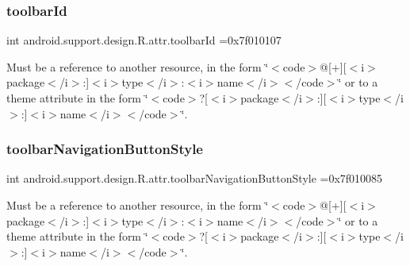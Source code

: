 \subsubsection{\texorpdfstring{toolbar\+Id}{toolbarId}}
{\footnotesize\ttfamily int android.\+support.\+design.\+R.\+attr.\+toolbar\+Id =0x7f010107\hspace{0.3cm}{\ttfamily [static]}}

Must be a reference to another resource, in the form \char`\"{}$<$code$>$@\mbox{[}+\mbox{]}\mbox{[}$<$i$>$package$<$/i$>$\+:\mbox{]}$<$i$>$type$<$/i$>$\+:$<$i$>$name$<$/i$>$$<$/code$>$\char`\"{} or to a theme attribute in the form \char`\"{}$<$code$>$?\mbox{[}$<$i$>$package$<$/i$>$\+:\mbox{]}\mbox{[}$<$i$>$type$<$/i$>$\+:\mbox{]}$<$i$>$name$<$/i$>$$<$/code$>$\char`\"{}. \mbox{\label{classandroid_1_1support_1_1design_1_1R_1_1attr_a4a1cd4185adacb795ddeeb79bf2f84aa}} 
\subsubsection{\texorpdfstring{toolbar\+Navigation\+Button\+Style}{toolbarNavigationButtonStyle}}
{\footnotesize\ttfamily int android.\+support.\+design.\+R.\+attr.\+toolbar\+Navigation\+Button\+Style =0x7f010085\hspace{0.3cm}{\ttfamily [static]}}

Must be a reference to another resource, in the form \char`\"{}$<$code$>$@\mbox{[}+\mbox{]}\mbox{[}$<$i$>$package$<$/i$>$\+:\mbox{]}$<$i$>$type$<$/i$>$\+:$<$i$>$name$<$/i$>$$<$/code$>$\char`\"{} or to a theme attribute in the form \char`\"{}$<$code$>$?\mbox{[}$<$i$>$package$<$/i$>$\+:\mbox{]}\mbox{[}$<$i$>$type$<$/i$>$\+:\mbox{]}$<$i$>$name$<$/i$>$$<$/code$>$\char`\"{}. \mbox{\label{classandroid_1_1support_1_1design_1_1R_1_1attr_a75b98851c40a539d3c8cba7e8429a3e4}} 
